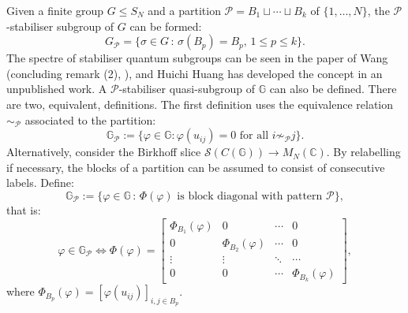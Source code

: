 \documentclass[12pt]{amsart}
\theoremstyle{remark}
\theoremstyle{remark}
\begin{document}
Given a finite group $G\leq S_N$ and a partition $\mathcal{P}=B_1\sqcup\cdots \sqcup B_k$ of $\{1,\dots,N\}$, the $\mathcal{P}$-stabiliser subgroup of $G$ can be formed:
$$G_{\mathcal{P}}=\{\sigma\in G\,\colon\, \sigma(B_p)=B_p,\,1\leq p\leq k\}.$$
The spectre of stabiliser quantum subgroups can be seen in the paper of Wang (concluding remark (2), \cite{wa2}), and Huichi Huang has developed the concept in an unpublished work. A $\mathcal{P}$-stabiliser quasi-subgroup of $\mathbb{G}$ can also be defined. There are two, equivalent, definitions. The first definition uses the equivalence relation $\sim_{\mathcal{P}}$ associated to the partition:
$$\mathbb{G}_{\mathcal{P}}:=\{\varphi\in\mathbb{G}\colon \varphi(u_{ij})=0\text{ for all }i\not\sim_{\mathcal{P}}j\}.$$
Alternatively, consider the Birkhoff slice $\mathcal{S}(C(\mathbb{G}))\to M_N(\mathbb{C})$. By relabelling if necessary, the blocks of a partition can be assumed to consist of consecutive labels. Define:
$$\mathbb{G}_{\mathcal{P}}:=\{\varphi\in\mathbb{G}\,\colon\,\Phi(\varphi)\text{ is block diagonal with pattern }\mathcal{P}\},$$
that is:
$$\varphi\in \mathbb{G}_{\mathcal{P}}\iff \Phi(\varphi)=\begin{bmatrix}
                                                  \Phi_{B_1}(\varphi) & 0 & \cdots & 0 \\
                                                  0 & \Phi_{B_2}(\varphi) & \cdots & 0 \\
                                                  \vdots & \vdots & \ddots & \cdots \\
                                                  0 & 0 & \cdots & \Phi_{B_k}(\varphi)
                                                \end{bmatrix},$$
                                                where $\Phi_{B_p}(\varphi)=[\varphi(u_{ij})]_{i,j\in B_p}$.
\end{document}
